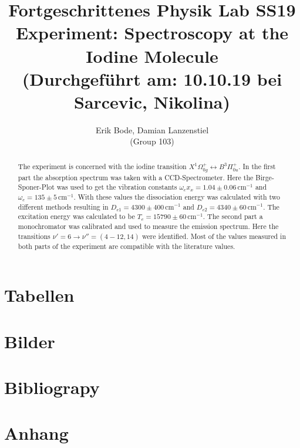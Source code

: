 \documentclass[30pt,a4paper]{article}
\title{
	\large Fortgeschrittenes Physik Lab	SS19 \\[4mm]
	\textbf{\LARGE Experiment: Spectroscopy at the Iodine Molecule
	} \\[4mm]
	(Durchgeführt am: 10.10.19 bei Sarcevic, Nikolina) \\}
\author{Erik Bode, Damian Lanzenstiel \\ (Group 103)}
\begin{document}
	
	\begin{titlepage}
		\maketitle
		\vspace{2cm}
		\begin{abstract}
			The experiment is concerned with the iodine transition $X^1\Omega_{0g}^+\leftrightarrow B^3\Pi_{0u}^+$. In the first part the absorption spectrum was taken with a CCD-Spectrometer. Here the Birge-Sponer-Plot was used to get the vibration constants $\omega_ex_x=1.04\pm 0.06\,\text{cm}^{-1}$ and $\omega_e=135\pm 5\,\text{cm}^{-1}$. With these values the dissociation energy was calculated with two different methods resulting in $D_{e1}=4300\pm 400\,\text{cm}^{-1}$ and $D_{e2}=4340\pm 60\,\text{cm}^{-1}$. The excitation energy was calculated to be $T_e=15790\pm 60\,\text{cm}^{-1}$. The second part a monochromator was calibrated and used to measure the emission spectrum. Here the transitions $\nu'=6 \rightarrow \nu''=(4-12,14)$ were identified. Most of the values  measured in both parts of the experiment are compatible with the literature values.
		\end{abstract}
	\end{titlepage}
	\newpage
	\tableofcontents
	\newpage
	
	
	
	
	
	
	\section*{Tabellen}
	\listoftables
	\section*{Bilder}
	\listoffigures
	\section{Bibliograpy}
	
	
	\section{Anhang}
	
\end{document}
